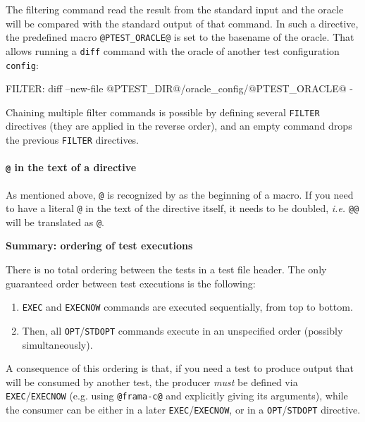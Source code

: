 \begin{itemize}
  The filtering command read the result from the standard input and the oracle
  will be compared with the standard output of that command.
  In such a directive, the predefined macro \texttt{@PTEST\_ORACLE@} is set to the
  basename of the oracle.
  That allows running a \texttt{diff} command with the oracle of another
  test configuration \texttt{config}:
  \begin{code}
FILTER: diff --new-file @PTEST_DIR@/oracle_config/@PTEST_ORACLE@ -
  \end{code}
  Chaining multiple filter commands is possible by defining several \texttt{FILTER} directives (they are applied in the reverse order),
  and an empty command drops the previous \texttt{FILTER} directives.
\end{itemize}

\begin{important}
\paragraph{\texttt{@} in the text of a directive}
As mentioned above, \texttt{@} is recognized by \ptests as the beginning of
a macro. If you need to have a literal \texttt{@} in the text of the directive
itself, it needs to be doubled, {\it i.e.} \texttt{@@} will be translated as
\texttt{@}.
\end{important}

\begin{important}
  \textbf{Summary: ordering of test executions}

  There is no total ordering between the tests in a test file header.
  The only guaranteed order between test executions is the following:

  \begin{enumerate}
  \item \texttt{EXEC} and \texttt{EXECNOW} commands are executed sequentially,
    from top to bottom.
  \item Then, all \texttt{OPT}/\texttt{STDOPT} commands execute in an
    unspecified order (possibly simultaneously).
  \end{enumerate}

  A consequence of this ordering is that, if you need a test to produce output
  that will be consumed by another test, the producer \emph{must} be defined via
  \texttt{EXEC}/\texttt{EXECNOW} (e.g. using \texttt{@frama-c@} and explicitly
  giving its arguments), while the consumer can be either in a later
  \texttt{EXEC}/\texttt{EXECNOW}, or in a \texttt{OPT}/\texttt{STDOPT}
  directive.
\end{important}

